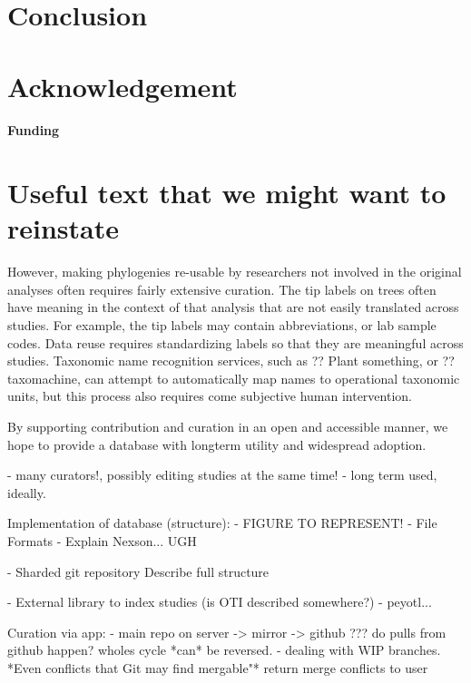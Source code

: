 \documentclass{bioinfo}
\begin{document}
\section{Conclusion}

\section*{Acknowledgement}

\paragraph{Funding\textcolon}



\section{Useful text that we might want to reinstate}
However, making phylogenies re-usable by researchers not involved in the original analyses often requires fairly extensive curation.
The tip labels on trees often have meaning in the context of that analysis that are not easily translated across studies. 
For example, the tip labels may contain abbreviations, or lab sample codes.
Data reuse requires standardizing labels so that they are meaningful across studies.
Taxonomic name recognition services, such as ?? Plant something, or ?? taxomachine, can attempt to automatically map names to
operational taxonomic units, but this process also requires come subjective human intervention. 

By supporting contribution and curation in an open and accessible manner, we hope to provide a database with longterm utility and widespread adoption.

          - many curators!, possibly editing studies at the same time!
          - long term used, ideally.

           Implementation of database (structure):
      - FIGURE TO REPRESENT!
      - File Formats
         - Explain Nexson... UGH
         
      - Sharded git repository
          Describe full structure 
          
      - External library to index studies (is OTI described somewhere?)
      - peyotl...
      
      Curation via app:
        - main repo on server -> mirror -> github
            ??? do pulls from github happen? wholes cycle *can* be reversed.
        - dealing with WIP branches.
        *Even conflicts that Git may find mergable"*
        return merge conflicts to user
\end{document}
